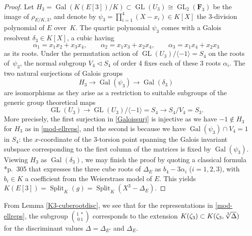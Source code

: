 \documentclass{amsart}
\theoremstyle{plain}
\theoremstyle{definition}
\DeclareMathOperator{\GL}{GL}
\DeclareMathOperator{\Gal}{Gal}
\DeclareMathOperator{\Split}{Split}
\newcommand{\FF}{{\mathbf{F}}}
\newcommand{\iso}{\cong}
\begin{document}
\begin{proof}
Let $H_3=\Gal(K(E[3])/K)\subset \GL(U_3)\iso \GL_2(\FF_3)$ be the image of 
$\rho_{E/K, 3}$, and denote by $\psi_3=\prod_{i=1}^4 (X- x_i)\in K[X]$ 
the 3-division polynomial of $E$ over~$K$.
The quartic polynomial $\psi_3$ comes with a Galois resolvent
$\delta_3\in K[X]$, a cubic having 
\[
\alpha_1=x_1x_2+x_3x_4, \qquad
\alpha_2=x_1x_3+x_2x_4, \qquad
\alpha_3=x_1x_4+x_2x_3
\]
as its roots. 
Under the permutation action of $\GL(U_3)/\langle -1\rangle=S_4$ on the roots of~$\psi_3$,
the normal subgroup $V_4\triangleleft S_4$ of order 4 fixes 
each of these 3 roots $\alpha_i$.
The two natural surjections of Galois groups
\begin{equation}
\label{Galoissurj}
H_3 \to \Gal(\psi_3)\to \Gal(\delta_3)
\end{equation}
are isomorphisms as they
arise as a restriction to suitable subgroups of the generic
group theoretical maps 
\[
\GL(U_3)\to \GL(U_3)/\langle-1\rangle=S_4 \to S_4/V_4=S_3.
\]
More precisely, the first surjection in \eqref{Galoissurj}
is injective as we have $-1\notin H_3$
for $H_3$ as in \eqref{mod-ellreps},
and the second is because we have $\Gal(\psi_3)\cap V_4= 1 $ in $S_4$:
the $x$-coordinate of the 3-torsion point spanning the Galois invariant subspace corresponding to the first column of the matrices 
is fixed by $\Gal(\psi_3)$.
Viewing $H_3$ as $\Gal(\delta_3)$, we may finish the proof by quoting
a classical formula \cite{Serre}*{p.~305} that expresses the three 
cube roots of $\Delta_E$ as $b_4-3\alpha_i$ ($i=1,2,3$), with
$b_i\in K$ a coefficient from the Weierstrass model of $E$.
This yields $K(E[3])=\Split_K(g)=\Split_K(X^3-\Delta_{E})$.
\end{proof}
\noindent
From Lemma \ref{K3-cuberootdisc}, we see that
for the representations in \eqref{mod-ellreps}, the subgroup
$\binom{1\ *}{0\ 1}$
corresponds to the extension 
$K(\zeta_3)\subset K(\zeta_3,\root 3 \of \Delta)$ 
for the discriminant values $\Delta=\Delta_{E'}$ and $\Delta_E$.
\end{document}
